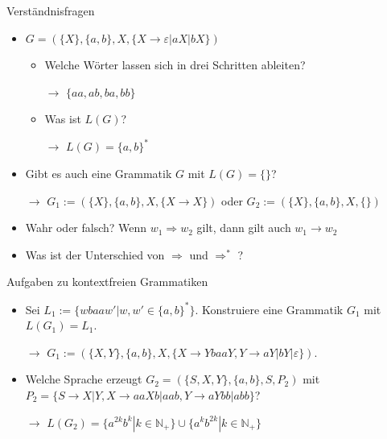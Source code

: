 \begin{frame}{Verständnisfragen}
	\begin{itemize}
		\item $G = (\{X\}, \{a,b\}, X, \{X \rightarrow \varepsilon| aX| bX\})$
		\begin{itemize}
			\item Welche Wörter lassen sich in drei Schritten ableiten?
			\pause		 		
			\item[$\rightarrow$] $\{aa, ab, ba, bb\}$
			\pause
			\item Was ist $L(G)$?
			\pause		 		
			\item[$\rightarrow$] $L(G) = \{a,b\}^*$
		\end{itemize}
		\pause
		\item Gibt es auch eine Grammatik $G$ mit $L(G) = \{\}$?
		\pause
		\item[$\rightarrow$] $G_1 := (\{X\}, \{a,b\}, X, \{X\rightarrow X\})$ oder $G_2 := (\{X\}, \{a,b\}, X, \{\})$
		\pause
		\item Wahr oder falsch? Wenn $w_1 \Rightarrow w_2$ gilt, dann gilt auch $w_1 \rightarrow w_2$
		\pause
		\item Was ist der Unterschied von $\Rightarrow$ und $\Rightarrow^*$ ?
	\end{itemize}
\end{frame}

\begin{frame}
	\begin{taskblock}{Aufgaben zu kontextfreien Grammatiken}
		\begin{itemize}
			\item Sei $L_1 := \{wbaaw'|w, w' \in \{a,b\}^*\}$. Konstruiere eine Grammatik $G_1$ mit $L(G_1) = L_1$.
			\pause
			\item[$\rightarrow$] $G_1 := (\{X, Y\}, \{a,b\}, X, \{X \rightarrow YbaaY, Y \rightarrow aY|bY|\varepsilon\})$.
			\pause
			\item  Welche Sprache erzeugt $ G_2 = (\{S, X, Y\}, \{a,b\}, S, P_2)$  mit $P_2 = \{S \rightarrow X|Y, X \rightarrow aaXb|aab, Y \rightarrow aYbb|abb\}$?
			\pause			
			\item[$\rightarrow$] $L(G_2) = \{a^{2k}b^{k} | k \in \mathbb{N}_+\} \cup \{a^kb^{2k}| k \in \mathbb{N}_+\}$
		\end{itemize}
	\end{taskblock}	
\end{frame}

